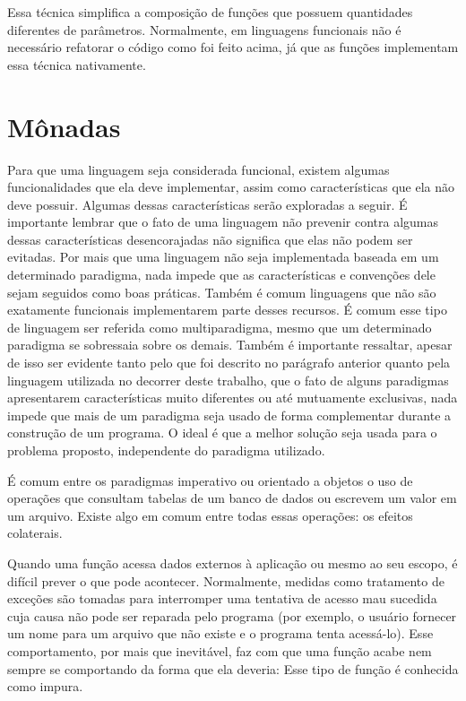 Essa técnica simplifica a composição de funções 
que possuem quantidades diferentes de parâmetros. 
Normalmente, em linguagens funcionais não é 
necessário refatorar o código como foi feito 
acima, já que as funções implementam essa técnica 
nativamente.



\section{Mônadas}



Para que uma linguagem seja considerada funcional, existem 
algumas funcionalidades que ela deve implementar, assim 
como características que ela não deve possuir. Algumas dessas 
características serão exploradas a seguir. É importante 
lembrar que o fato de uma linguagem não prevenir contra 
algumas dessas características desencorajadas não significa 
que elas não podem ser evitadas. Por mais que uma linguagem 
não seja implementada baseada em um determinado paradigma, 
nada impede que as características e convenções dele sejam 
seguidos como boas práticas. Também é comum linguagens que 
não são exatamente funcionais implementarem parte desses 
recursos. É comum esse tipo de linguagem ser referida como 
multiparadigma, mesmo que um determinado paradigma se 
sobressaia sobre os demais.
Também é importante ressaltar, apesar de isso ser 
evidente tanto pelo que foi descrito no parágrafo anterior 
quanto pela linguagem utilizada no decorrer deste trabalho, 
que o fato de alguns paradigmas apresentarem características 
muito diferentes ou até mutuamente exclusivas, nada impede 
que mais de um paradigma seja usado de forma complementar 
durante a construção de um programa. O ideal é que a melhor 
solução seja usada para o problema proposto, independente 
do paradigma utilizado.



É comum entre os paradigmas imperativo ou orientado a objetos 
o uso de operações que consultam tabelas de um banco de dados 
ou escrevem um valor em um arquivo. Existe algo em comum 
entre todas essas operações: os efeitos colaterais. 

Quando uma função acessa dados externos à aplicação ou 
mesmo ao seu escopo, é difícil prever o que pode acontecer. 
Normalmente, medidas como tratamento de exceções são tomadas 
para interromper uma tentativa de acesso mau sucedida cuja 
causa não pode ser reparada pelo programa (por exemplo, 
o usuário fornecer um nome para um arquivo que não existe e 
o programa tenta acessá-lo). Esse comportamento, por mais 
que inevitável, faz com que uma função acabe nem sempre se 
comportando da forma que ela deveria: Esse tipo de função é 
conhecida como impura.

